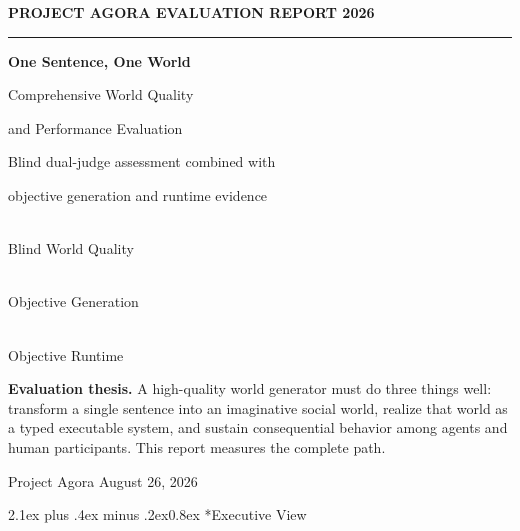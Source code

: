 \documentclass[11pt,a4paper]{article}
\makeatletter
\renewcommand\section{\@startsection{section}{1}{0pt}%
  {2.1ex plus .4ex minus .2ex}{0.8ex}%
  {\color{AgoraInk}\sffamily\Large\bfseries}}
\newcommand{\scorepill}[3]{%
  \colorbox{#1}{\parbox[c][24mm][c]{0.285\textwidth}{%
    \centering\sffamily\color{AgoraInk}{\Large\bfseries #2}\\[-1pt]{\small #3}}}%
}
\makeatother
\begin{document}
\begin{titlepage}
  \thispagestyle{empty}
  \vspace*{7mm}
  {\sffamily\small\bfseries\color{AgoraTeal}PROJECT AGORA \hfill EVALUATION REPORT 2026}

  \vspace{7mm}
  {\color{AgoraTeal}\rule{\textwidth}{2.2pt}}
  \vspace{17mm}

  {\sffamily\fontsize{31}{35}\selectfont\bfseries\color{AgoraInk}
    One Sentence, One World\par}
  \vspace{4mm}
  {\sffamily\fontsize{21}{26}\selectfont\color{AgoraInk}
    Comprehensive World Quality\par
    and Performance Evaluation\par}

  \vspace{9mm}
  {\sffamily\large\color{AgoraMuted}
    Blind dual-judge assessment combined with\par
    objective generation and runtime evidence}

  \vfill

  \noindent
  \scorepill{AgoraPaleTeal}{40\%}{Blind World Quality}\hfill
  \scorepill{AgoraPaleCoral}{35\%}{Objective Generation}\hfill
  \scorepill{AgoraPaleGold}{25\%}{Objective Runtime}

  \vspace{14mm}
  \colorbox{AgoraPaper}{%
    \parbox{0.94\textwidth}{%
      \vspace{4mm}
      \hspace{4mm}\begin{minipage}{0.88\textwidth}
      \sffamily\color{AgoraInk}
      \textbf{Evaluation thesis.} A high-quality world generator must do three things well:
      transform a single sentence into an imaginative social world, realize that world as a
      typed executable system, and sustain consequential behavior among agents and human
      participants. This report measures the complete path.
      \end{minipage}
      \vspace{4mm}
    }}

  \vspace{12mm}
  {\sffamily\small\color{AgoraMuted}Project Agora \hfill August 26, 2026}
\end{titlepage}

\section*{Executive View}
\end{document}
